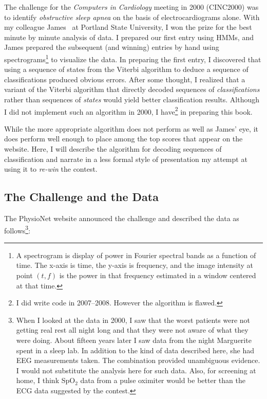 \documentclass[]{article}
\begin{document}
The challenge for the \emph{Computers in Cardiology} meeting in 2000
(CINC2000) was to
identify \emph{obstructive sleep apnea} on the basis of
electrocardiograms alone.  With my colleague James~ at
Portland State University, I won the prize for the best minute by
minute analysis of data.  I prepared our first entry using HMMs, and
James prepared the subsequent (and winning) entries by hand using
spectrograms\footnote{A spectrogram is display of power in Fourier
  spectral bands as a function of time.  The x-axis is time, the
  y-axis is frequency, and the image intensity at point $(t,f)$ is the
  power in that frequency estimated in a window centered at that
  time.} to visualize the data. In preparing the
first entry, I discovered that using a sequence of states from the
Viterbi algorithm to deduce a sequence of classifications produced
obvious errors.  After some thought, I realized that a variant of the
Viterbi algorithm that directly decoded sequences of
\emph{classifications} rather than sequences of \emph{states} would
yield better classification results.  Although I did not implement
such an algorithm in 2000, I have\footnote{I did write code in
  2007--2008.  However the algorithm is flawed.} in preparing this
book.

While the more appropriate algorithm does not perform as well as
James' eye, it does perform well enough to place among the top scores
that appear on the~
website.  Here, I will describe the algorithm for decoding
sequences of classification and narrate in a less formal style of
presentation my attempt at using it to \emph{re-win} the contest.

\subsection{The  Challenge and the Data}\label{sec:challenge}

The PhysioNet website announced the challenge and described the data
as follows\footnote{When I looked at the data in 2000, I saw that the
  worst patients were not getting real rest all night long and that
  they were not aware of what they were doing.  About fifteen years
  later I saw data from the night Marguerite spent in a sleep lab.  In
  addition to the kind of data described here, she had EEG
  measurements taken.  The combination provided unambiguous evidence.
  I would not substitute the analysis here for such data.  Also, for
  screening at home, I think SpO$_2$ data from a pulse oximiter would
  be better than the ECG data suggested by the contest.}:
\end{document}
